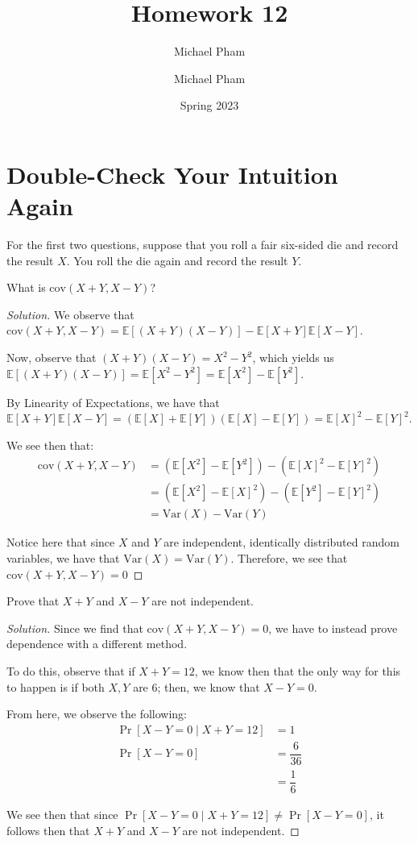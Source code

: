 \documentclass{article}
\title{#1}
\author{Michael Pham}
\date{#2}
\newenvironment{solution}{\begin{proof}[Solution]}{\end{proof}}
\newcommand{\E}{\mathbb{E}}
\newcommand{\Var}{\mathrm{Var}}
\newcommand{\cov}{\mathrm{cov}}
\newcommand{\mytitle}[2]{%
	\title{#1}
	\author{Michael Pham}
	\date{#2}
	\maketitle
	\newpage
	\tableofcontents
	\newpage
}
\begin{document}
\mytitle{Homework 12}{Spring 2023}

\section{Double-Check Your Intuition Again}
For the first two questions, suppose that you roll a fair six-sided die and record the result $X$. You roll the die again and record the result $Y$.
\begin{hw}
	What is $\cov (X+Y, X-Y)$?
\end{hw}
\begin{solution}
	We observe that $\cov(X+Y, X-Y) = \E[(X+Y)(X-Y)]- \E[X+Y]\E[X-Y]$.
	
	Now, observe that $(X+Y)(X-Y) = X^{2} - Y^{2}$, which yields us $\E[(X+Y)(X-Y)] = \E[X^{2} - Y^{2}] = \E[X^{2}] - \E[Y^{2}]$.
	
	By Linearity of Expectations, we have that $\E[X+Y]\E[X-Y] = \left( \E[X] + \E[Y] \right)\left( \E[X] - \E[Y] \right) = \E[X]^{2} - \E[Y]^{2}$.
	
	We see then that:
	\begin{align*}
		\cov (X+Y, X-Y) &= (\E[X^{2}] - \E[Y^{2}]) - (\E[X]^{2} - \E[Y]^{2}) \\
		&= (\E[X^{2}] - \E[X]^{2}) - (\E[Y^{2}] - \E[Y]^{2}) \\
		&= \Var(X) - \Var(Y)
	\end{align*}

	Notice here that since $X$ and $Y$ are independent, identically distributed random variables, we have that $\Var(X) = \Var(Y)$. Therefore, we see that $\cov(X+Y, X-Y) = 0$
\end{solution}

\begin{hw}
	Prove that $X+Y$ and $X-Y$ are not independent.
\end{hw}
\begin{solution}
	Since we find that $\cov(X+Y, X-Y) = 0$, we have to instead prove dependence with a different method.
	
	To do this, observe that if $X + Y = 12$, we know then that the only way for this to happen is if both $X,Y$ are 6; then, we know that $X-Y = 0$.
	
	From here, we observe the following:
	\begin{align*}
		\Pr[X-Y = 0 \mid X + Y = 12] &= 1 \\
		\Pr[X - Y = 0] &= \dfrac{6}{36} \\
		&= \dfrac{1}{6}
	\end{align*}

	We see then that since $\Pr[X-Y = 0 \mid X + Y = 12] \not= \Pr[X-Y = 0]$, it follows then that $X+Y$ and $X-Y$ are not independent.
\end{solution}
\end{document}
